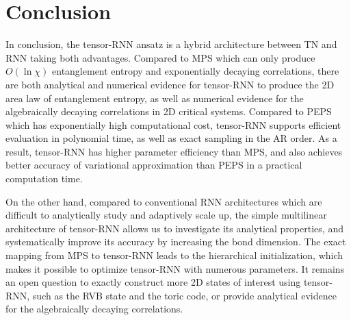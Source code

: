 \section{Conclusion}

In conclusion, the tensor-RNN ansatz is a hybrid architecture between TN and RNN taking both advantages. Compared to MPS which can only produce $O(\ln \chi)$ entanglement entropy and exponentially decaying correlations, there are both analytical and numerical evidence for tensor-RNN to produce the 2D area law of entanglement entropy, as well as numerical evidence for the algebraically decaying correlations in 2D critical systems. Compared to PEPS which has exponentially high computational cost, tensor-RNN supports efficient evaluation in polynomial time, as well as exact sampling in the AR order. As a result, tensor-RNN has higher parameter efficiency than MPS, and also achieves better accuracy of variational approximation than PEPS in a practical computation time.

On the other hand, compared to conventional RNN architectures which are difficult to analytically study and adaptively scale up, the simple multilinear architecture of tensor-RNN allows us to investigate its analytical properties, and systematically improve its accuracy by increasing the bond dimension. The exact mapping from MPS to tensor-RNN leads to the hierarchical initialization, which makes it possible to optimize tensor-RNN with numerous parameters. It remains an open question to exactly construct more 2D states of interest using tensor-RNN, such as the RVB state and the toric code, or provide analytical evidence for the algebraically decaying correlations.
